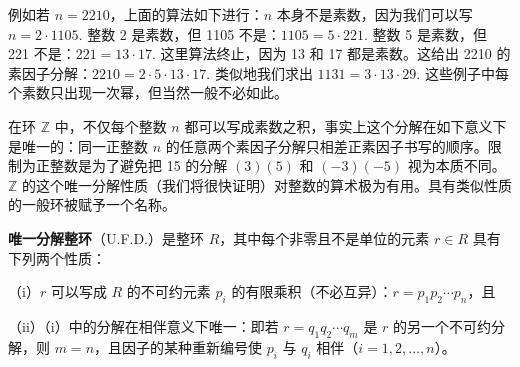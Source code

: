 例如若 \(n = 2210\)，上面的算法如下进行：\(n\) 本身不是素数，因为我们可以写 \(n = 2 \cdot 1105\). 整数 2 是素数，但 1105 不是：\(1105 = 5 \cdot 221\). 整数 5 是素数，但 221 不是：\(221 = 13 \cdot 17\). 这里算法终止，因为 13 和 17 都是素数。这给出 2210 的素因子分解：\(2210 = 2 \cdot 5 \cdot 13 \cdot 17\). 类似地我们求出 \(1131 = 3 \cdot 13 \cdot 29\). 这些例子中每个素数只出现一次幂，但当然一般不必如此。

在环 \(\mathbb{Z}\) 中，不仅每个整数 \(n\) 都可以写成素数之积，事实上这个分解在如下意义下是唯一的：同一正整数 \(n\) 的任意两个素因子分解只相差正素因子书写的顺序。限制为正整数是为了避免把 15 的分解 \((3)(5)\) 和 \((-3)(-5)\) 视为本质不同。\(\mathbb{Z}\) 的这个唯一分解性质（我们将很快证明）对整数的算术极为有用。具有类似性质的一般环被赋予一个名称。

\begin{definition}
\textbf{唯一分解整环}（U.F.D.）是整环 \(R\)，其中每个非零且不是单位的元素 \(r \in R\) 具有下列两个性质：

（i）\(r\) 可以写成 \(R\) 的不可约元素 \(p_i\) 的有限乘积（不必互异）：\(r = p_1p_2\cdots p_n\)，且

（ii）（i）中的分解在相伴意义下唯一：即若 \(r = q_1q_2\cdots q_m\) 是 \(r\) 的另一个不可约分解，则 \(m = n\)，且因子的某种重新编号使 \(p_i\) 与 \(q_i\) 相伴（\(i = 1, 2, \ldots, n\)）。
\end{definition}

